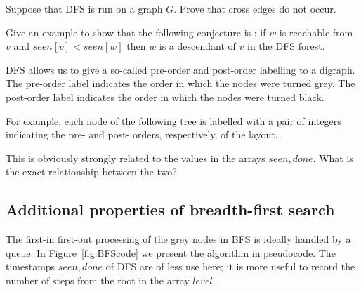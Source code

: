 \begin{Exercise}
\label{ex:DFS-graph-no-cross}
Suppose that DFS is run on a graph $G$. Prove that cross edges do not occur.
\end{Exercise}


\begin{Exercise}
\label{ex:DFS-false-conj}
Give an example to show that the following conjecture is : if $w$ is reachable from $v$ and $seen[v] < seen[w]$ then $w$ is
a descendant of $v$ in the DFS forest.
\end{Exercise}


\begin{Exercise}
\label{ex:DFS-prepostorder}
DFS allows us to give a so-called pre-order and post-order labelling to
a digraph. The pre-order label indicates the order in which the nodes
were turned grey. The post-order label indicates the order in which the
nodes were turned black.

For example, each node of the following tree is labelled with a pair of
integers indicating the pre- and post- orders, respectively, of the
layout.

\smallskip

\centerline{}

This is obviously strongly related to the values in the arrays $seen,
done$. What is the exact relationship between the two?


\end{Exercise}


\subsection{Additional properties of breadth-first search}

The first-in first-out processing of the grey nodes in BFS is ideally
handled by a queue. In Figure~\ref{fig:BFScode} we present the algorithm
in pseudocode. The timestamps $seen, done$ of DFS are of less use here;
it is more useful to record the number of steps from the root in the
array $level$.

